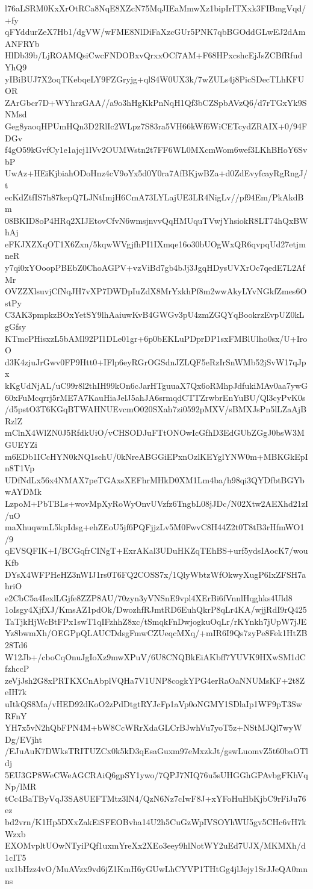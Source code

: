 l76aLSRM0KxXrOtRCa8NqE8XZcN75MqJIEaMmwXz1bipIrITXxk3FIBmgVqd/+fy
qFYddurZeX7Hb1/dgVW/wFME8NlDiFaXzcGUr5PNK7qbBGOddGLwEJ2dAmANFRYb
HlDb39b/LjROAMQsiCwcFNDOBxvQrxxOCf7AM+F68HPxcshcEjJsZCBfRfudYhQ9
yIBiBUJ7X2oqTKebqeLY9FZGryjg+qlS4W0UX3k/7wZULs4j8PicSDecTLhKFUOR
ZArGbcr7D+WYhrzGAA//a9o3hHgKkPnNqH1Qf3bCZSpbAVzQ6/d7rTGxYk9SNMsd
Geg8yaoqHPUmHQn3D2RlIc2WLpz7S83ra5VH66kWf6WiCETcydZRAIX+0/94FDGv
f4gO59kGvfCy1e1ajcj1lVv2OUMWstn2t7FF6WL0MXcmWom6wef3LKhBHoY6SvbP
UwAz+HEiKjbiahODoHnz4cV9oYx5d0Y0ra7AfBKjwBZa+d0ZdEvyfcayRgRngJ/t
ecKdZtfIS7h87kepQ7LJNtImjH6CmA73LYLajUE3LR4NigLv//pf94Em/PkAkdBm
08BKID8oP4HRq2XIJEtovCfvN6wmsjnvvQqHMUquTVwjYhsiokR8LT74hQxBWhAj
eFKJXZXqOT1X6Zxn/5kqwWVgjfhPI1IXmqe16o30bUOgWxQR6qvpqUd27etjmneR
y7qi0xYOoopPBEbZ0ChoAGPV+vzViBd7gb4bJj3JgqHDysUVXrOc7qedE7L2AfMr
OVZZXlsuvjCfNqJH7vXP7DWDpIuZdX8MrYxkhPf8m2wwAkyLYvNGkfZmes6OstPy
C3AK3pmpkzBOxYetSY9lhAaiuwKvB4GWGv3pU4zmZGQYqBookrzEvpUZ0kLgGfsy
KTmcPHisxzL5bAMl92PI1DLe01gr+6p0bEKLuPDprDP1sxFMBlUlho0sx/U+IroO
d3K4zjuJrGwv0FP9Htt0+IFlp6eyRGrOGSdnJZLQF5eRzIrSnWMb52jSvW17qJpx
kKgUdNjAL/uC99r8l2thIH99kOn6cJarHTguuaX7Qx6oRMhpJdfukiMAv0aa7ywG
60xFuMcqrrj5rME7A7KauHiaJelJ5ahJA6srmqdCTTZrwbrEnYuBU/Ql3cyPvK0s
/d5pstO3T6KGqBTWAHNUEvcmO020SXah7zi0592pMXV/sBMXJsPn5lLZaAjBRzlZ
mClnX4WlZN0J5RfdkUiO/vCHSODJuFTtONOwIcGfhD3EdGUbZGgJ0bsW3MGUEYZi
m6EDb1ICcHYN0kNQ1schU/0kNreABGGiEPxnOzlKEYglYNW0m+MBKGkEpIn8T1Vp
UDfNdLx56x4NMAX7peTGAxsXEFhrMHkD0XM1Lm4ba/h98qi3QYDfbtBGYbwAYDMk
LzpoM+PbTBLs+wovMpXyRoWyOnvUVzfz6TngbL08jJDc/N02Xtw2AEXhd21zI/uO
maXhuqwmL5kpIdsg+ehZEoU5jf6PQFjjzLv5M0FwvC8H44Z2t0T8tB3rHfmWO1/9
qEVSQFIK+I/BCGqfrCINgT+ExrAKal3UDuHKZqTEhBS+urf5ydsIAocK7/wouKfb
DYsX4WFPHeHZ3nWIJ1rs0T6FQ2COSS7x/1QlyWbtzWfOkwyXugP6IxZFSH7ahriO
e2CbC5a4IexlLGjfe8ZZP8AU/70zyn3yVNSnE9vpl4XErBi6fVnnlHqghks4Uld8
1oIsgy4XjfXJ/KmsAZ1pdOk/DwozhfRJmtRD6EuhQkrP8qLr4KA/wjjRdI9rQ425
TaTjkHjWcBtFPx1swT1qIFzhhZ8xc/tSmqkFnDwjogkuOqLr/rKYnkh7jUpW7jJE
Yz8bwmXh/OEGPpQLAUCDdsgFmwCZUeqcMXq/+mIR6I9Qs7zyPe8Fek1HtZB28Td6
W12Jb+/cboCqOnuJgIoXz9mwXPuV/6U8CNQBkEiAKbff7YUVK9HXwSM1dCfzhccP
zeVjJsh2G8xPRTKXCnAbplVQHa7V1UNP8cogkYPG4erRaOaNNUMsKF+2t8ZeIH7k
uItkQS8Ma/vHED92dKoO2zPdDtgtRYJcFp1aVp0oNGMY1SDlaIp1WF9pT3SwRFnY
YH7x5vN2hQbFPN4M+bW8CcWRrXdaGLCrBJwhVu7yoT5z+NStMJQl7wyWDg/EVjht
/EJuAuK7DWksTRITUZCx0k5kD3qEsaGuxm97eMxzkJt/gswLuomvZ5t60baOTldj
5EU3GP8WeCWeAGCRAiQ6gpSY1ywo/7QPJ7NIQ76u5sUHGGhGPAvbgFKhVqNp/lMR
tCc4BaTByVqJ3SA8UEFTMtz3lN4/QzN6Nz7cIwF8J+xYFoHuHbKjbC9rFiJu76ez
bd2vrn/K1Hp5DXxZakEiSFEOBvha14U2h5CuGzWpIVSOYhWU5gv5CHc6vH7kWzxb
EXOMvpltUOwNTyiPQf1uxmYreXx2XEo3eey9hlNotWY2uEd7UJX/MKMXh/d1cIT5
ux1bHzz4vO/MuAVzx9vd6jZ1KmH6yGUwLhCYVP1THtGg4jlJejy1SrJJeQA0mnns
